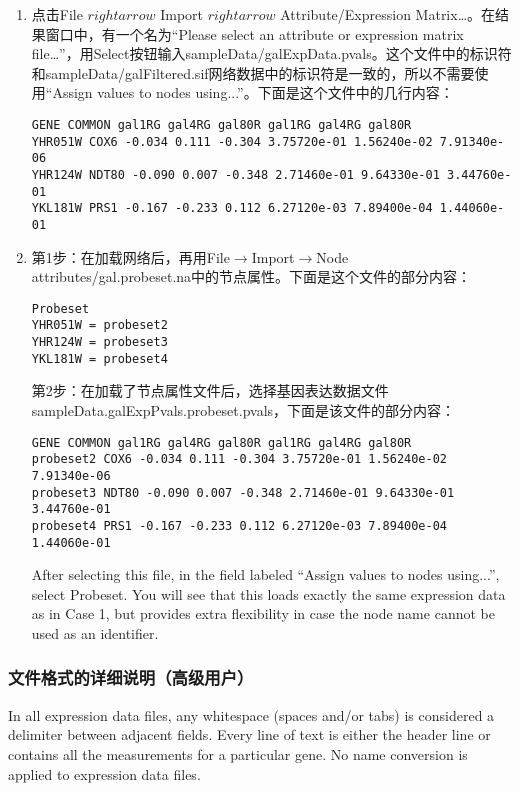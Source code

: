 \begin{enumerate}
\renewcommand{\labelenumi}{\textbf{Option \Alph{enumi}.}}
\item 点击File $rightarrow$ Import $rightarrow$ Attribute/Expression Matrix\ldots 。在结果窗口中，有一个名为``Please select an attribute or expression matrix file\ldots''，用Select按钮输入sampleData/galExpData.pvals。这个文件中的标识符和sampleData/galFiltered.sif网络数据中的标识符是一致的，所以不需要使用``Assign values to nodes using...''。下面是这个文件中的几行内容：
 \begin{verbatim}
GENE COMMON gal1RG gal4RG gal80R gal1RG gal4RG gal80R
YHR051W COX6 -0.034 0.111 -0.304 3.75720e-01 1.56240e-02 7.91340e-06
YHR124W NDT80 -0.090 0.007 -0.348 2.71460e-01 9.64330e-01 3.44760e-01
YKL181W PRS1 -0.167 -0.233 0.112 6.27120e-03 7.89400e-04 1.44060e-01
\end{verbatim}
\item 第1步：在加载网络后，再用File$\rightarrow$Import$\rightarrow$Node attributes/gal.probeset.na中的节点属性。下面是这个文件的部分内容：
 \begin{verbatim}
Probeset
YHR051W = probeset2
YHR124W = probeset3
YKL181W = probeset4
\end{verbatim}

第2步：在加载了节点属性文件后，选择基因表达数据文件sampleData.galExpPvals.probeset.pvals，下面是该文件的部分内容： 
 \begin{verbatim}
GENE COMMON gal1RG gal4RG gal80R gal1RG gal4RG gal80R
probeset2 COX6 -0.034 0.111 -0.304 3.75720e-01 1.56240e-02 7.91340e-06
probeset3 NDT80 -0.090 0.007 -0.348 2.71460e-01 9.64330e-01 3.44760e-01
probeset4 PRS1 -0.167 -0.233 0.112 6.27120e-03 7.89400e-04 1.44060e-01
\end{verbatim}
 After selecting this file, in the field labeled ``Assign values to nodes using...'', select Probeset. You will see that this loads exactly the same expression data as in Case 1, but provides extra flexibility in case the node name cannot be used as an identifier. 
 \end{enumerate}

\subsubsection{文件格式的详细说明（高级用户）}
 In all expression data files, any whitespace (spaces and/or tabs) is considered a delimiter between adjacent fields. Every line of text is either the header line or contains all the measurements for a particular gene. No name conversion is applied to expression data files. 

